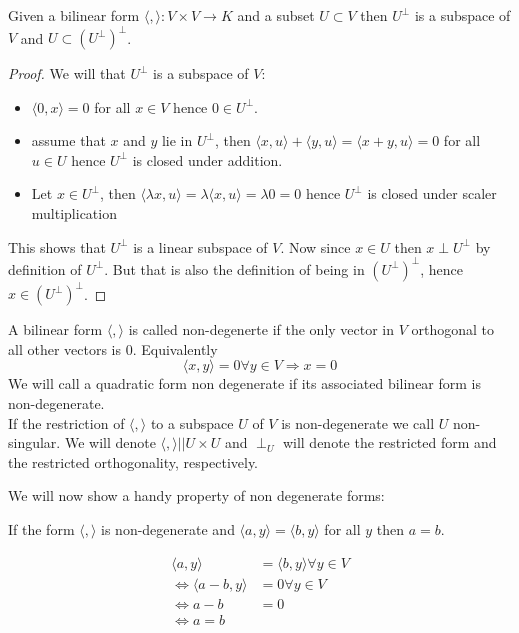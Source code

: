 \documentclass[../Thesis.tex]{subfiles}
\begin{document}
\begin{prop}
Given a bilinear form $\langle , \rangle : V \times V \rightarrow K$ and a subset $U \subset V$ then $U^\perp$ is a subspace of $V$ and $U \subset (U^\perp)^\perp$.
\end{prop}
\begin{proof}
We will that $U^\perp$ is a subspace of $V$:
\begin{itemize}
\item $\langle 0, x \rangle = 0$ for all $x \in V$ hence $0 \in U^\perp$.
\item assume that $x$ and $y$ lie in $U^\perp$, then $\langle x, u \rangle + \langle y, u \rangle = \langle x + y , u \rangle = 0$ for all $u \in U$ hence $U^\perp$ is closed under addition.
\item Let $x \in U^\perp$, then $\langle \lambda x, u \rangle = \lambda \langle x , u \rangle = \lambda 0 = 0$ hence $U^\perp$ is closed under scaler multiplication
\end{itemize}
This shows that $U^\perp$ is a linear subspace of $V$. Now since $x \in U$ then $x \perp U^\perp$ by definition of $U^\perp$. But that is also the definition of being in $(U^ \perp)^\perp$, hence $ x \in (U^\perp)^\perp$.
\end{proof}
\begin{mydef}
A bilinear form $\langle , \rangle$ is called non-degenerte if the only vector in $V$ orthogonal to all other vectors is $0$. Equivalently
\begin{equation}
\langle x,y \rangle = 0 \forall y \in V \Rightarrow x = 0
\end{equation}
We will call a quadratic form non degenerate if its associated bilinear form is non-degenerate.
\\If the restriction of $\langle , \rangle$ to a subspace $U$ of $V$ is non-degenerate we call $U$ non-singular. We will denote $\langle , \rangle|{|U \times U}$ and $\perp_U$ will denote the restricted form and the restricted orthogonality, respectively.
\end{mydef}
We will now show a handy property of non degenerate forms:
\begin{prop}
If the form $\langle , \rangle$ is non-degenerate and $\langle a,y \rangle = \langle b, y \rangle$ for all $y$ then $a = b$.
\end{prop}
\begin{myproof}
\begin{align*}
\langle a, y \rangle &= \langle b, y \rangle \forall y \in V \\
\Leftrightarrow \langle a-b,y \rangle &= 0 \forall y \in V\\
\Leftrightarrow a - b &= 0 \\
\Leftrightarrow a = b
\end{align*}
\end{myproof}
\end{document}
